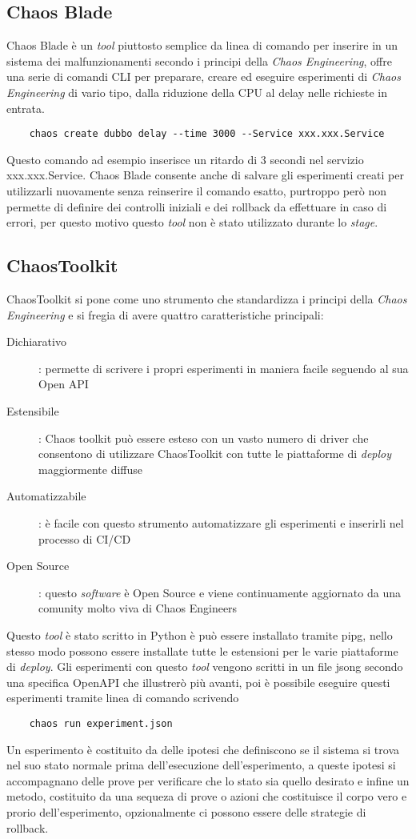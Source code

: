 \subsection{Chaos Blade}
Chaos Blade è un \textit{tool} piuttosto semplice da linea di comando per inserire in un sistema dei malfunzionamenti secondo i principi della \textit{Chaos Engineering}, offre una serie di comandi CLI per preparare, creare ed eseguire esperimenti di \textit{Chaos Engineering} di vario tipo, dalla riduzione della CPU al delay nelle richieste in entrata.
\begin{verbatim}
    chaos create dubbo delay --time 3000 --Service xxx.xxx.Service
\end{verbatim}
Questo comando ad esempio inserisce un ritardo di 3 secondi nel servizio xxx.xxx.Service.
Chaos Blade consente anche di salvare gli esperimenti creati per utilizzarli nuovamente senza reinserire il comando esatto, purtroppo però non permette di definire dei controlli iniziali e dei rollback da effettuare in caso di errori, per questo motivo questo \textit{tool} non è stato utilizzato durante lo \textit{stage}.

\subsection{ChaosToolkit}
ChaosToolkit si pone come uno strumento che standardizza i principi della \textit{Chaos Engineering} e si fregia di avere quattro caratteristiche principali:
\begin{description}
    \item[Dichiarativo]: permette di scrivere i propri esperimenti in maniera facile seguendo al sua Open API
    \item[Estensibile]: Chaos toolkit può essere esteso con un vasto numero di driver che consentono di utilizzare ChaosToolkit con tutte le piattaforme di \textit{deploy} maggiormente diffuse
    \item[Automatizzabile]: è facile con questo strumento automatizzare gli esperimenti e inserirli nel processo di CI/CD
    \item[Open Source]: questo \textit{software} è Open Source e viene continuamente aggiornato da una comunity molto viva di Chaos Engineers
\end{description}
Questo \textit{tool} è stato scritto in Python è può essere installato tramite \gls{pipg}, nello stesso modo possono essere installate tutte le estensioni per le varie piattaforme di \textit{deploy}.
Gli esperimenti con questo \textit{tool} vengono scritti in un file \gls{jsong} secondo una specifica OpenAPI che illustrerò più avanti, poi è possibile eseguire questi esperimenti tramite linea di comando scrivendo
\begin{verbatim}
    chaos run experiment.json
\end{verbatim}
Un esperimento è costituito da delle ipotesi che definiscono se il sistema si trova nel suo stato normale prima dell'esecuzione dell'esperimento, a queste ipotesi si accompagnano delle prove per verificare che lo stato sia quello desirato e infine un metodo, costituito da una sequeza di prove o azioni che costituisce il corpo vero e prorio dell'esperimento, opzionalmente ci possono essere delle strategie di rollback.

